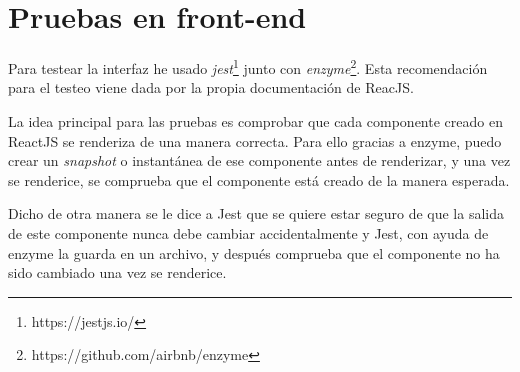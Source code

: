 \section{Pruebas en front-end}

Para testear la interfaz he usado \textit{jest}\footnote{https://jestjs.io/} junto con \textit{enzyme}\footnote{https://github.com/airbnb/enzyme}. Esta recomendación para el testeo viene dada por la propia documentación de ReacJS\cite{testreact}.

La idea principal para las pruebas es comprobar que cada componente creado en ReactJS se renderiza de una manera correcta. Para ello gracias a enzyme, puedo crear un \textit{snapshot} o instantánea de ese componente antes de renderizar, y una vez se renderice, se comprueba que el componente está creado de la manera esperada\cite{testreact2}.

Dicho de otra manera se le dice a Jest que se quiere estar seguro de que la salida de este componente nunca debe cambiar accidentalmente y Jest, con ayuda de enzyme la guarda en un archivo, y después comprueba que el componente no ha sido cambiado una vez se renderice.